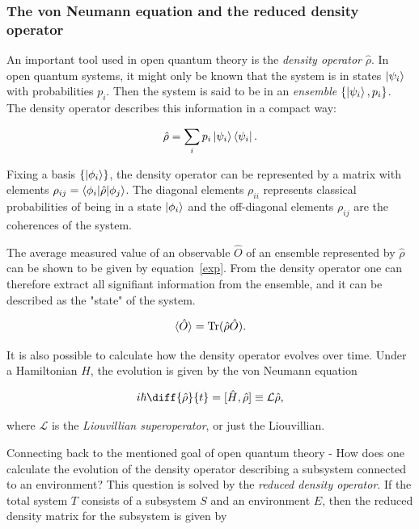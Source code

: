 \documentclass[../main.tex]{subfiles}
\begin{document}
\subsubsection{The von Neumann equation and the reduced density operator}

An important tool used in open quantum theory is the \textit{density operator} $\hat{\rho}$. In open quantum systems, it might only be known that the system is in states $\ket{\psi_i}$ with probabilities $p_i$. Then the system is said to be in an \textit{ensemble} $\{\ket{\psi_i}, p_i\}$. The density operator describes this information in a compact way:

\begin{equation}
    \hat{\rho} = \sum_i p_i \ket{\psi_i}\bra{\psi_i}.
\end{equation}

Fixing a basis $\{\ket{\phi_i}\}$, the density operator can be represented by a matrix with elements $\rho_{ij} = \braket{\phi_i|\hat\rho|\phi_j}$. The diagonal elements $\rho_{ii}$ represents classical probabilities of being in a state $\ket{\phi_i}$ and the off-diagonal elements $\rho_{ij}$ are the coherences of the system.

The average measured value of an observable $\hat O$ of an ensemble represented by $\hat\rho$ can be shown to be given by equation~\eqref{exp}. From the density operator one can therefore extract all signifiant information from the ensemble, and it can be described as the "state" of the system.

\begin{equation}\label{exp}
    \braket{\hat O} = \operatorname{Tr}({\hat\rho \hat O}).
\end{equation}

It is also possible to calculate how the density operator evolves over time. Under a Hamiltonian $\hat H$, the evolution is given by the von Neumann equation

\begin{equation}\label{vonneumann}
    i\hbar\diff{\hat\rho}{t} = [\hat H, \hat\rho] \equiv \mathcal{L}\hat\rho,
\end{equation}

where $\mathcal{L}$ is the \textit{Liouvillian superoperator}, or just the Liouvillian. 

Connecting back to the mentioned goal of open quantum theory - How does one calculate the evolution of the density operator describing a subsystem connected to an environment? This question is solved by the \textit{reduced density operator}. If the total system $T$ consists of a subsystem $S$ and an environment $E$, then the reduced density matrix for the subsystem is given by
\end{document}
